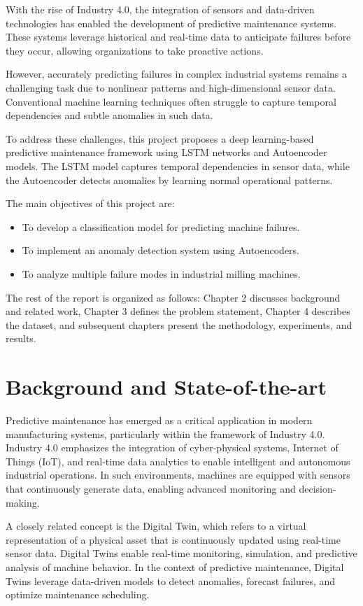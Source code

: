 \documentclass{ecsproject}     %
\begin{document}
With the rise of Industry 4.0, the integration of sensors and data-driven technologies has enabled the development of predictive maintenance systems. These systems leverage historical and real-time data to anticipate failures before they occur, allowing organizations to take proactive actions.

However, accurately predicting failures in complex industrial systems remains a challenging task due to nonlinear patterns and high-dimensional sensor data. Conventional machine learning techniques often struggle to capture temporal dependencies and subtle anomalies in such data.

To address these challenges, this project proposes a deep learning-based predictive maintenance framework using LSTM networks and Autoencoder models. The LSTM model captures temporal dependencies in sensor data, while the Autoencoder detects anomalies by learning normal operational patterns.

The main objectives of this project are:
\begin{itemize}
    \item To develop a classification model for predicting machine failures.
    \item To implement an anomaly detection system using Autoencoders.
    \item To analyze multiple failure modes in industrial milling machines.
\end{itemize}

The rest of the report is organized as follows: Chapter 2 discusses background and related work, Chapter 3 defines the problem statement, Chapter 4 describes the dataset, and subsequent chapters present the methodology, experiments, and results.


\chapter{Background and State-of-the-art}

Predictive maintenance has emerged as a critical application in modern manufacturing systems, particularly within the framework of Industry 4.0. Industry 4.0 emphasizes the integration of cyber-physical systems, Internet of Things (IoT), and real-time data analytics to enable intelligent and autonomous industrial operations. In such environments, machines are equipped with sensors that continuously generate data, enabling advanced monitoring and decision-making.

A closely related concept is the Digital Twin, which refers to a virtual representation of a physical asset that is continuously updated using real-time sensor data. Digital Twins enable real-time monitoring, simulation, and predictive analysis of machine behavior. In the context of predictive maintenance, Digital Twins leverage data-driven models to detect anomalies, forecast failures, and optimize maintenance scheduling.
\end{document}
